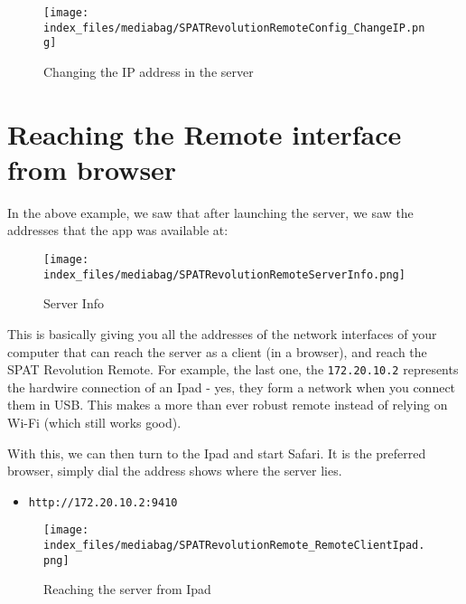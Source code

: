 \documentclass[
  letterpaper,
  DIV=11,
  numbers=noendperiod]{scrreport}
\providecommand{\tightlist}{%
  \setlength{\itemsep}{0pt}\setlength{\parskip}{0pt}}\usepackage{longtable,booktabs,array}
\begin{document}
\begin{figure}

{\centering \texttt{[image: index\_files/mediabag/SPATRevolutionRemoteConfig\_ChangeIP.png]}

}

\caption{Changing the IP address in the server}

\end{figure}

\hypertarget{reaching-the-remote-interface-from-browser}{%
\section{Reaching the Remote interface from
browser}\label{reaching-the-remote-interface-from-browser}}

In the above example, we saw that after launching the server, we saw the
addresses that the app was available at:

\begin{figure}

{\centering \texttt{[image: index\_files/mediabag/SPATRevolutionRemoteServerInfo.png]}

}

\caption{Server Info}

\end{figure}

This is basically giving you all the addresses of the network interfaces
of your computer that can reach the server as a client (in a browser),
and reach the SPAT Revolution Remote. For example, the last one, the
\texttt{172.20.10.2} represents the hardwire connection of an Ipad -
yes, they form a network when you connect them in USB. This makes a more
than ever robust remote instead of relying on Wi-Fi (which still works
good).

With this, we can then turn to the Ipad and start Safari. It is the
preferred browser, simply dial the address shows where the server lies.

\begin{itemize}
\tightlist
\item
  \texttt{http://172.20.10.2:9410}
\end{itemize}

\begin{figure}

{\centering \texttt{[image: index\_files/mediabag/SPATRevolutionRemote\_RemoteClientIpad.png]}

}

\caption{Reaching the server from Ipad}

\end{figure}
\end{document}
